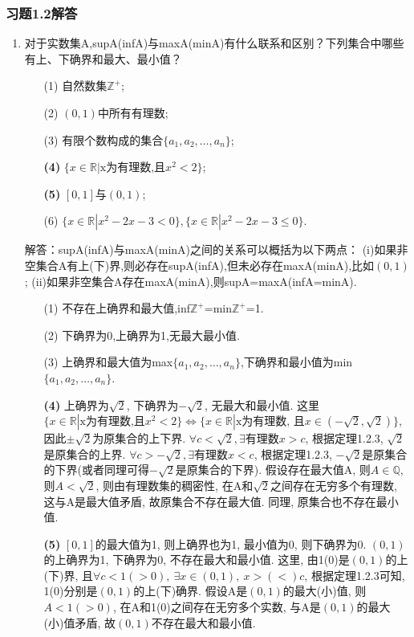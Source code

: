\documentclass[12pt,UTF8]{ctexart}
\begin{document}
\subsubsection{习题1.2解答}
\begin{enumerate}
\item 
对于实数集A,supA(infA)与maxA(minA)有什么联系和区别？下列集合中哪些有上、下确界和最大、最小值？
\begin{enumerate}
\item[(1)]自然数集$\mathbb Z^+$;
\item[(2)]$(0,1)$中所有有理数;
\item[(3)]有限个数构成的集合$\{a_1,a_2,\dots,a_n\}$;
\item[\bf(4)]\footnotemark[2]$\{x\in \mathbb{R}|\text{x为有理数,且}x^2<2\}$;
\item[\bf(5)]$[0,1]$与$(0,1)$;
\item[(6)]$\{x\in\mathbb{R}|x^2-2x-3<0\},\{x\in\mathbb{R}|x^2-2x-3\leq0\}$.
\end{enumerate}
解答：supA(infA)与maxA(minA)之间的关系可以概括为以下两点：
\newline(i)如果非空集合A有上(下)界,则必存在supA(infA),但未必存在maxA(minA),比如$(0,1)$;
\newline(ii)如果非空集合A存在maxA(minA),则supA=maxA(infA=minA).
\begin{enumerate}
\item[(1)]不存在上确界和最大值,inf$\mathbb Z^+$=min$\mathbb Z^+$=1.
\item[(2)]下确界为0,上确界为1,无最大最小值.
\item[(3)]上确界和最大值为max$\{a_1,a_2,\dots,a_n\}$,下确界和最小值为min$\{a_1,a_2,\dots,a_n\}$.
\item[\bf(4)]上确界为$\sqrt2$, 下确界为$-\sqrt2$, 无最大和最小值. 这里$\{x\in \mathbb{R}|\text{x为有理数,且}x^2<2\}\Leftrightarrow\{x\in \mathbb{R}|\text{x为有理数, 且}x\in(-\sqrt2,\sqrt2)\}$, 因此$\pm\sqrt2$为原集合的上下界. $\forall c<\sqrt2,\exists\text{有理数}x>c$, 根据定理1.2.3, $\sqrt2$是原集合的上界. $\forall c>-\sqrt2,\exists\text{有理数}x<c$, 根据定理1.2.3, $-\sqrt2$是原集合的下界(或者同理可得$-\sqrt2$是原集合的下界). 假设存在最大值A, 则$A\in\mathbb Q$, 则$A<\sqrt2$, 则由有理数集的稠密性, 在A和$\sqrt2$之间存在无穷多个有理数, 这与A是最大值矛盾, 故原集合不存在最大值. 同理, 原集合也不存在最小值.
\item[\bf(5)]$[0,1]$的最大值为1, 则上确界也为1, 最小值为0, 则下确界为0.  $(0,1)$的上确界为1, 下确界为0, 不存在最大和最小值. 这里, 由1(0)是$(0,1)$的上(下)界, 且$\forall c<1(>0),\ \exists x\in(0,1),\ x>(<)c$, 根据定理1.2.3可知, 1(0)分别是$(0,1)$的上(下)确界. 假设A是$(0,1)$的最大(小)值, 则$A<1(>0)$, 在A和1(0)之间存在无穷多个实数, 与A是$(0,1)$的最大(小)值矛盾, 故$(0,1)$不存在最大和最小值.

\end{enumerate}
\end{enumerate}
\end{document}
